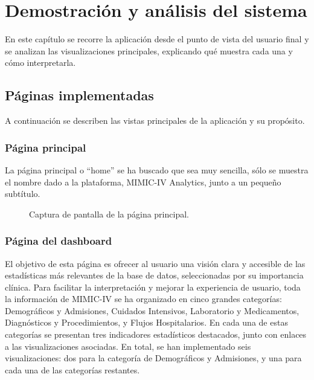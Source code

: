 \chapter{Demostración y análisis del sistema}

En este capítulo se recorre la aplicación desde el punto de vista del usuario final y se analizan las visualizaciones principales, explicando qué muestra cada una y cómo interpretarla.

\section{Páginas implementadas}

A continuación se describen las vistas principales de la aplicación y su propósito.

\subsection{Página principal}
La página principal o ``home'' se ha buscado que sea muy sencilla, sólo se muestra el nombre dado a la plataforma, MIMIC-IV Analytics, junto a un pequeño subtítulo. 
\begin{figure}[H]
  \centering
  \caption{Captura de pantalla de la página principal.}
  \label{fig:home}
\end{figure}

\subsection{Página del dashboard}
El objetivo de esta página es ofrecer al usuario una visión clara y accesible de las estadísticas más relevantes de la base de datos, seleccionadas por su importancia clínica. Para facilitar la interpretación y mejorar la experiencia de usuario, toda la información de MIMIC-IV se ha organizado en cinco grandes categorías: Demográficos y Admisiones, Cuidados Intensivos, Laboratorio y Medicamentos, Diagnósticos y Procedimientos, y Flujos Hospitalarios. En cada una de estas categorías se presentan tres indicadores estadísticos destacados, junto con enlaces a las visualizaciones asociadas. En total, se han implementado seis visualizaciones: dos para la categoría de Demográficos y Admisiones, y una para cada una de las categorías restantes.

